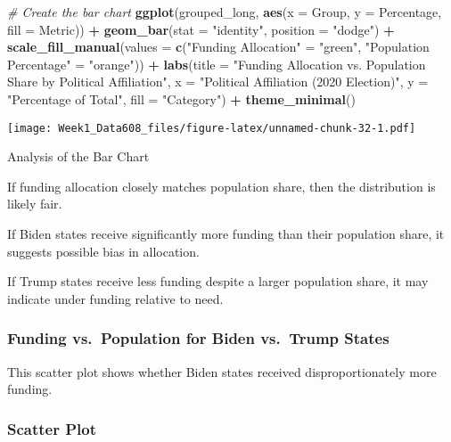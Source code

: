 \documentclass[
]{article}
\newenvironment{Shaded}{\begin{snugshade}}{\end{snugshade}}
\newcommand{\AttributeTok}[1]{\textcolor[rgb]{0.13,0.29,0.53}{#1}}
\newcommand{\CommentTok}[1]{\textcolor[rgb]{0.56,0.35,0.01}{\textit{#1}}}
\newcommand{\FunctionTok}[1]{\textcolor[rgb]{0.13,0.29,0.53}{\textbf{#1}}}
\newcommand{\NormalTok}[1]{#1}
\newcommand{\OtherTok}[1]{\textcolor[rgb]{0.56,0.35,0.01}{#1}}
\newcommand{\SpecialCharTok}[1]{\textcolor[rgb]{0.81,0.36,0.00}{\textbf{#1}}}
\newcommand{\StringTok}[1]{\textcolor[rgb]{0.31,0.60,0.02}{#1}}
\begin{document}
\begin{Shaded}
\begin{Highlighting}[]
\CommentTok{\# Create the bar chart}
\FunctionTok{ggplot}\NormalTok{(grouped\_long, }\FunctionTok{aes}\NormalTok{(}\AttributeTok{x =}\NormalTok{ Group, }\AttributeTok{y =}\NormalTok{ Percentage, }\AttributeTok{fill =}\NormalTok{ Metric)) }\SpecialCharTok{+}
  \FunctionTok{geom\_bar}\NormalTok{(}\AttributeTok{stat =} \StringTok{"identity"}\NormalTok{, }\AttributeTok{position =} \StringTok{"dodge"}\NormalTok{) }\SpecialCharTok{+}
  \FunctionTok{scale\_fill\_manual}\NormalTok{(}\AttributeTok{values =} \FunctionTok{c}\NormalTok{(}\StringTok{"Funding Allocation"} \OtherTok{=} \StringTok{"green"}\NormalTok{, }\StringTok{"Population Percentage"} \OtherTok{=} \StringTok{"orange"}\NormalTok{)) }\SpecialCharTok{+}
  \FunctionTok{labs}\NormalTok{(}\AttributeTok{title =} \StringTok{"Funding Allocation vs. Population Share by Political Affiliation"}\NormalTok{,}
       \AttributeTok{x =} \StringTok{"Political Affiliation (2020 Election)"}\NormalTok{,}
       \AttributeTok{y =} \StringTok{"Percentage of Total"}\NormalTok{,}
       \AttributeTok{fill =} \StringTok{"Category"}\NormalTok{) }\SpecialCharTok{+}
  \FunctionTok{theme\_minimal}\NormalTok{()}
\end{Highlighting}
\end{Shaded}

\texttt{[image: Week1\_Data608\_files/figure-latex/unnamed-chunk-32-1.pdf]}

Analysis of the Bar Chart

If funding allocation closely matches population share, then the
distribution is likely fair.

If Biden states receive significantly more funding than their population
share, it suggests possible bias in allocation.

If Trump states receive less funding despite a larger population share,
it may indicate under funding relative to need.

\subsubsection{Funding vs.~Population for Biden vs.~Trump
States}\label{funding-vs.-population-for-biden-vs.-trump-states}

This scatter plot shows whether Biden states received disproportionately
more funding.

\subsubsection{Scatter Plot}\label{scatter-plot}
\end{document}

